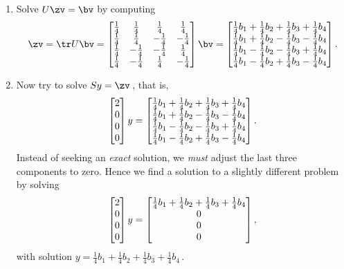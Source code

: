 \begin{example}
\begin{enumerate}
\item Solve \(U\zv=\bv\) by computing 
\begin{equation*}
\zv=\tr U\bv
=\begin{bmatrix} 
  \h&\h&\h&\h
\\\h&\h&-\h&-\h
\\\h&-\h&-\h&\h
\\\h&-\h&\h&-\h \end{bmatrix}\bv
=\begin{bmatrix} \h b_1+\h b_2+\h b_3+\h b_4
\\\h b_1+\h b_2-\h b_3-\h b_4
\\\h b_1-\h b_2-\h b_3+\h b_4
\\\h b_1-\h b_2+\h b_3-\h b_4 \end{bmatrix}.
\end{equation*}

\item  Now try to solve \(Sy=\zv\)\,, that is,
\begin{equation*}
\begin{bmatrix} 2\\0\\0\\0 \end{bmatrix}y
=\begin{bmatrix} \h b_1+\h b_2+\h b_3+\h b_4
\\\h b_1+\h b_2-\h b_3-\h b_4
\\\h b_1-\h b_2-\h b_3+\h b_4
\\\h b_1-\h b_2+\h b_3-\h b_4 \end{bmatrix}.
\end{equation*}
Instead of seeking an \emph{exact} solution,  we \emph{must} adjust the last three components to zero. 
Hence we find a solution to a slightly different problem by solving
\begin{equation*}
\begin{bmatrix} 2\\0\\0\\0 \end{bmatrix}y
=\begin{bmatrix} \h b_1+\h b_2+\h b_3+\h b_4\\0\\0\\0 \end{bmatrix},
\end{equation*}
\def\h{\frac14}%
with solution \(y=\h b_1+\h b_2+\h b_3+\h b_4\)\,.


\end{enumerate}
\end{example}
